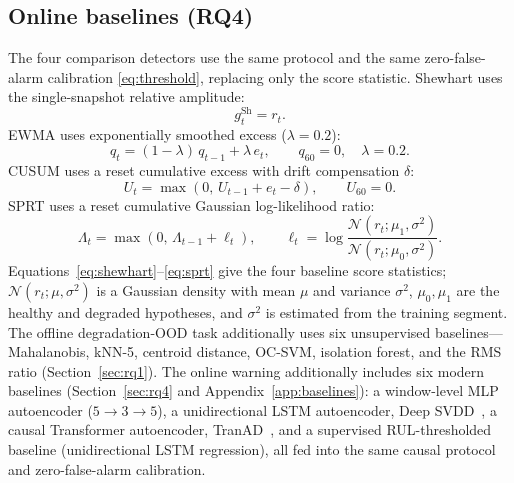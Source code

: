 \documentclass[journal]{IEEEtran}
\begin{document}
\subsection{Online baselines (RQ4)}
The four comparison detectors use the same protocol and the same zero-false-alarm calibration \eqref{eq:threshold}, replacing only the score statistic. Shewhart uses the single-snapshot relative amplitude:
\begin{equation}
g_t^{\mathrm{Sh}}=r_t.
\label{eq:shewhart}
\end{equation}
EWMA uses exponentially smoothed excess ($\lambda=0.2$):
\begin{equation}
q_t=(1-\lambda)\,q_{t-1}+\lambda\,e_t,\qquad q_{60}=0,\quad\lambda=0.2.
\label{eq:ewma}
\end{equation}
CUSUM uses a reset cumulative excess with drift compensation $\delta$:
\begin{equation}
U_t=\max\left(0,\,U_{t-1}+e_t-\delta\right),\qquad U_{60}=0.
\label{eq:cusum}
\end{equation}
SPRT uses a reset cumulative Gaussian log-likelihood ratio:
\begin{equation}
\Lambda_t=\max\left(0,\,\Lambda_{t-1}+\ell_t\right),\qquad
\ell_t=\log\frac{\mathcal{N}\left(r_t;\mu_1,\sigma^2\right)}{\mathcal{N}\left(r_t;\mu_0,\sigma^2\right)}.
\label{eq:sprt}
\end{equation}
Equations~\eqref{eq:shewhart}--\eqref{eq:sprt} give the four baseline score statistics; $\mathcal{N}(r_t;\mu,\sigma^2)$ is a Gaussian density with mean $\mu$ and variance $\sigma^2$, $\mu_0,\mu_1$ are the healthy and degraded hypotheses, and $\sigma^2$ is estimated from the training segment. The offline degradation-OOD task additionally uses six unsupervised baselines---Mahalanobis, kNN-5, centroid distance, OC-SVM, isolation forest, and the RMS ratio (Section~\ref{sec:rq1}). The online warning additionally includes six modern baselines (Section~\ref{sec:rq4} and Appendix~\ref{app:baselines}): a window-level MLP autoencoder ($5\to3\to5$), a unidirectional LSTM autoencoder, Deep SVDD~\cite{ruff2018}, a causal Transformer autoencoder, TranAD~\cite{tuli2022tranad}, and a supervised RUL-thresholded baseline (unidirectional LSTM regression), all fed into the same causal protocol and zero-false-alarm calibration.
\end{document}
